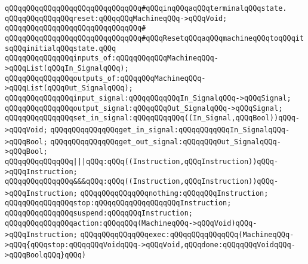 \verb|qQQqqQQqqQQqqQQqqQQqqQQqqQQqqQQq#qQQqinqQQqaqQQqterminalqQQqstate.|\newline
\newline
\verb|qQQqqQQqqQQqqQQqreset:qQQqqQQqMachineqQQq->qQQqVoid;|\newline
\verb|qQQqqQQqqQQqqQQqqQQqqQQqqQQqqQQq#|\newline
\verb|qQQqqQQqqQQqqQQqqQQqqQQqqQQqqQQq#qQQqResetqQQqaqQQqmachineqQQqtoqQQqitsqQQqinitialqQQqstate.qQQq|\newline
\newline
\verb|qQQqqQQqqQQqqQQqinputs_of:qQQqqQQqqQQqMachineqQQq->qQQqList(qQQqIn_SignalqQQq);|\newline
\verb|qQQqqQQqqQQqqQQqoutputs_of:qQQqqQQqMachineqQQq->qQQqList(qQQqOut_SignalqQQq);|\newline
\newline
\verb|qQQqqQQqqQQqqQQqinput_signal:qQQqqQQqqQQqIn_SignalqQQq->qQQqSignal;|\newline
\verb|qQQqqQQqqQQqqQQqoutput_signal:qQQqqQQqOut_SignalqQQq->qQQqSignal;|\newline
\newline
\verb|qQQqqQQqqQQqqQQqset_in_signal:qQQqqQQqqQQq((In_Signal,qQQqBool))qQQq->qQQqVoid;|\newline
\verb|qQQqqQQqqQQqqQQqget_in_signal:qQQqqQQqqQQqIn_SignalqQQq->qQQqBool;|\newline
\verb|qQQqqQQqqQQqqQQqget_out_signal:qQQqqQQqOut_SignalqQQq->qQQqBool;|\newline
\newline
\verb|qQQqqQQqqQQqqQQq|\verb#|||qQQq:qQQq((Instruction,qQQqInstruction))qQQq->qQQqInstruction;#\newline
\verb|qQQqqQQqqQQqqQQq&&&qQQq:qQQq((Instruction,qQQqInstruction))qQQq->qQQqInstruction;|\newline
\newline
\verb|qQQqqQQqqQQqqQQqnothing:qQQqqQQqInstruction;|\newline
\verb|qQQqqQQqqQQqqQQqstop:qQQqqQQqqQQqqQQqqQQqInstruction;|\newline
\verb|qQQqqQQqqQQqqQQqsuspend:qQQqqQQqInstruction;|\newline
\newline
\verb|qQQqqQQqqQQqqQQqaction:qQQqqQQq(MachineqQQq->qQQqVoid)qQQq->qQQqInstruction;|\newline
\verb|qQQqqQQqqQQqqQQqexec:qQQqqQQqqQQqqQQq(MachineqQQq->qQQq{qQQqstop:qQQqqQQqVoidqQQq->qQQqVoid,qQQqdone:qQQqqQQqVoidqQQq->qQQqBoolqQQq}qQQq)|\newline
